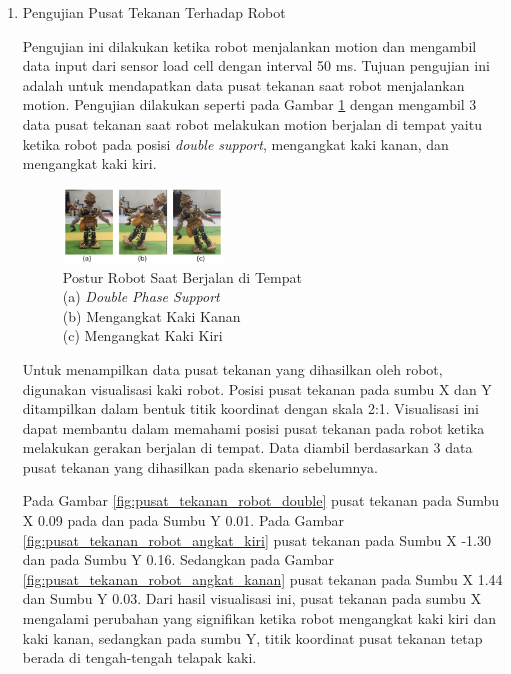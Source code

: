 \begin{enumerate}[label=\Alph*.]
    \newpage

    \item Pengujian Pusat Tekanan Terhadap Robot
    \label{subsec:hasil-pembahasan-pusat-tekanan}

        \hspace*{1em} Pengujian ini dilakukan ketika robot menjalankan motion dan mengambil data input dari sensor load cell dengan interval 50 ms. Tujuan pengujian ini adalah untuk mendapatkan data pusat tekanan saat robot menjalankan motion. Pengujian dilakukan seperti pada Gambar \ref{fig:pusat_tekanan_robot} dengan mengambil 3 data pusat tekanan saat robot melakukan motion berjalan di tempat yaitu ketika robot pada posisi \textit{double support}, mengangkat kaki kanan, dan mengangkat kaki kiri. 

        \begin{figure}[h]
            \centering
            \includegraphics[width=0.4\textwidth]{gambar/hasil/jalan_ditempat.png}
            \caption{Postur Robot Saat Berjalan di Tempat \\ (a)  \textit{Double Phase Support} \\ (b)  Mengangkat Kaki Kanan \\ (c)  Mengangkat Kaki Kiri}
            \label{fig:pusat_tekanan_robot}
        \end{figure}

        \hspace*{1em} Untuk menampilkan data pusat tekanan yang dihasilkan oleh robot, digunakan visualisasi kaki robot. Posisi pusat tekanan pada sumbu X dan Y ditampilkan dalam bentuk titik koordinat dengan skala 2:1. Visualisasi ini dapat membantu dalam memahami posisi pusat tekanan pada robot ketika melakukan gerakan berjalan di tempat. Data diambil berdasarkan 3 data pusat tekanan yang dihasilkan pada skenario sebelumnya.

        \hspace*{1em} Pada Gambar \ref{fig:pusat_tekanan_robot_double} pusat tekanan pada Sumbu X 0.09 pada dan pada Sumbu Y 0.01. Pada Gambar \ref{fig:pusat_tekanan_robot_angkat_kiri} pusat tekanan pada Sumbu X -1.30 dan pada Sumbu Y 0.16. Sedangkan pada Gambar \ref{fig:pusat_tekanan_robot_angkat_kanan} pusat tekanan pada Sumbu X 1.44 dan Sumbu Y 0.03. Dari hasil visualisasi ini, pusat tekanan pada sumbu X mengalami perubahan yang signifikan ketika robot mengangkat kaki kiri dan kaki kanan, sedangkan pada sumbu Y, titik koordinat pusat tekanan tetap berada di tengah-tengah telapak kaki.
        

\end{enumerate}
